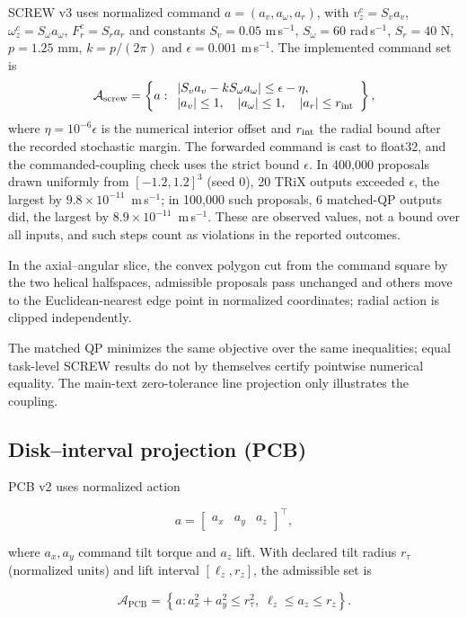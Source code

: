 \documentclass[10pt]{article}
\begin{document}
SCREW v3 uses normalized command
$a=(a_v,a_\omega,a_r)$, with
$v_z^c=S_v a_v$, $\omega_z^c=S_\omega a_\omega$,
$F_r^c=S_r a_r$ and constants
$S_v=0.05$ m\,s$^{-1}$, $S_\omega=60$ rad\,s$^{-1}$,
$S_r=40$ N, $p=1.25$ mm, $k=p/(2\pi)$ and
$\epsilon=0.001$ m\,s$^{-1}$. The implemented command set is
\[
\mathcal A_{\rm screw}=
\left\{a:
\begin{array}{l}
|S_v a_v-kS_\omega a_\omega|\leq\epsilon-\eta,\\
|a_v|\leq1,\quad |a_\omega|\leq1,\quad |a_r|\leq r_{\rm int}
\end{array}\right\},
\]
where $\eta=10^{-6}\epsilon$ is the numerical interior offset and
$r_{\rm int}$ the radial bound after the recorded stochastic margin. The
forwarded command is cast to float32, and the commanded-coupling check uses the
strict bound $\epsilon$. In 400,000 proposals drawn uniformly from $[-1.2,1.2]^3$
(seed 0), 20 TRiX outputs exceeded $\epsilon$, the largest by
$9.8\times10^{-11}$~m\,s$^{-1}$; in 100,000 such proposals, 6 matched-QP outputs
did, the largest by $8.9\times10^{-11}$~m\,s$^{-1}$. These are observed values,
not a bound over all inputs, and such steps count as violations in the reported
outcomes.

In the axial--angular slice, the convex polygon cut from the command square by
the two helical halfspaces, admissible proposals pass unchanged and others move
to the Euclidean-nearest edge point in normalized coordinates; radial action is
clipped independently.

The matched QP minimizes the same objective over the same inequalities;
equal task-level SCREW results do not by themselves certify pointwise numerical
equality. The main-text zero-tolerance line projection only illustrates the
coupling.


\subsection{Disk--interval projection (PCB)}

PCB v2 uses normalized action

\[
a=
\begin{bmatrix}
a_x & a_y & a_z
\end{bmatrix}^{\top},
\]

where $a_x,a_y$ command tilt torque and $a_z$ lift. With
declared tilt radius $r_\tau$ (normalized units) and lift
interval $[\ell_z,r_z]$, the admissible set is

\[
\mathcal{A}_{\mathrm{PCB}}
=
\left\{
a:
a_x^2+a_y^2\leq r_\tau^2,
\;
\ell_z\leq a_z\leq r_z
\right\}.
\]
\end{document}
